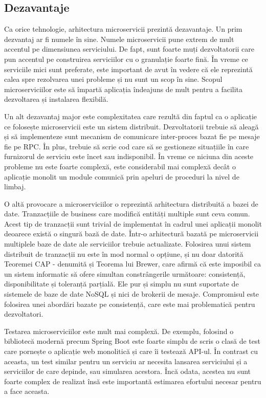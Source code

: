 \documentclass[12pt, a4paper, oneside, romanian]{teza-upb}
\begin{document}
\subsection{Dezavantaje}

Ca orice tehnologie, arhitectura microservicii prezintă dezavantaje. Un prim dezvantaj ar fi numele în sine. Numele microservicii pune extrem de mult accentul pe dimensiunea serviciului. De fapt, sunt foarte muți dezvoltatorii care pun accentul pe construirea serviciilor cu o granulație foarte fină. În vreme ce serviciile mici sunt preferate, este important de avut în vedere că ele reprezintă calea spre rezolvarea unei probleme și nu sunt un scop în sine. Scopul microserviciilor este să împartă aplicația îndeajuns de mult pentru a facilita dezvoltarea și instalarea flexibilă. 

Un alt dezavantaj major este complexitatea care rezultă din faptul ca o aplicație ce folosește microservicii este un sistem distribuit. Dezvoltatorii trebuie să aleagă și să implementeze sunt mecanism de comunicare inter-proces bazat fie pe mesaje fie pe RPC. În plus, trebuie să scrie cod care să se gestioneze situațiile în care furnizorul de serviciu este încet sau indisponibil. În vreme ce niciuna din aceste probleme nu este foarte complexă, este considerabil mai complexă decât o aplicație monolit un module comunică prin apeluri de proceduri la nivel de limbaj.   

O altă provocare a microserviciilor o reprezintă arhitectura distribuită a bazei de date. Tranzacțiile de business care modifică entități multiple sunt ceva comun. Acest tip de tranzacții sunt trivial de implementat în cadrul unei aplicații monolit deoarece există o singură bază de date. Într-o arhitectură bazată pe microservicii multiplele baze de date ale serviciilor trebuie actualizate. Folosirea unui sistem distribuit de tranzacții nu este în mod normal o opțiune, și nu doar datorită Teoremei CAP - denumită și Teorema lui Brewer, care afirmă că este imposibil ca un sistem informatic să ofere simultan constrângerile următoare: consistență, disponibilitate și toleranță parțială. Ele pur și simplu nu sunt suportate de sistemele de baze de date NoSQL și nici de brokerii de mesaje. Compromisul este folosirea unei abordări bazate pe consistență, care este mai problematică pentru dezvoltatori. 

Testarea microserviciilor este mult mai complexă. De exemplu, folosind o bibliotecă modernă precum Spring Boot este foarte simplu de scris o clasă de test care pornește o aplicație web monolitică și care îi testează API-ul. În contrast cu aceasta, un test similar pentru un serviciu ar necesita lansarea serviciului și a serviciilor de care depinde, sau simularea acestora. Încă odata, acestea nu sunt foarte complex de realizat însă este importantă estimarea efortului necesar pentru a face aceasta. 
\end{document}
